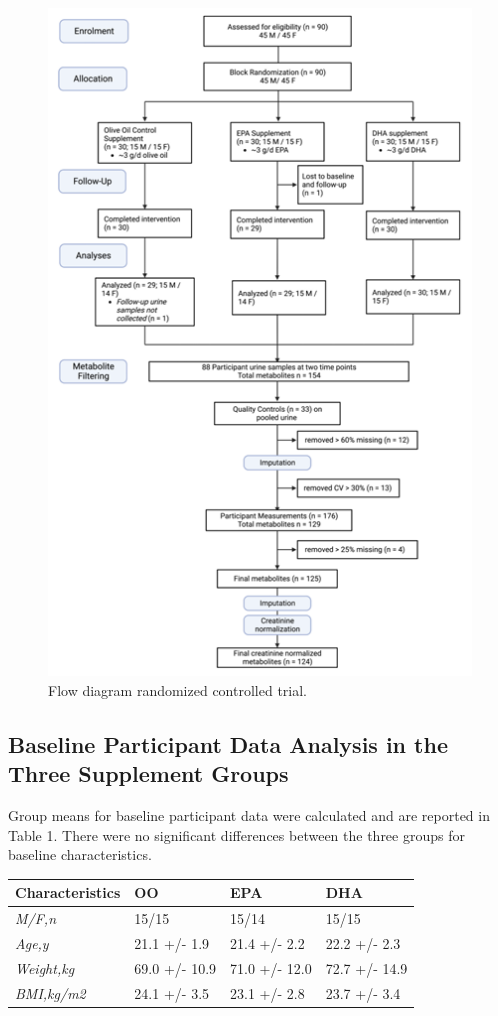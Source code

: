 \documentclass[journal=jacsat,manuscript=article]{achemso}
\begin{document}
\begin{figure}
\includegraphics[width=0.8\linewidth]{../Figures/Participants_study_design} \caption{Flow diagram randomized controlled trial.}\label{fig:unnamed-chunk-1}
\end{figure}

\subsection{Baseline Participant Data Analysis in the Three Supplement
Groups}\label{baseline-participant-data-analysis-in-the-three-supplement-groups}

Group means for baseline participant data were calculated and are
reported in Table 1. There were no significant differences between the
three groups for baseline characteristics.

\begin{longtable}[]{@{}llll@{}}
\toprule\noalign{}
\textbf{Characteristics} & \textbf{OO} & \textbf{EPA} & \textbf{DHA} \\
\midrule\noalign{}
\endhead
\bottomrule\noalign{}
\endlastfoot
\emph{M/F,n} & 15/15 & 15/14 & 15/15 \\
\emph{Age,y} & 21.1 +/- 1.9 & 21.4 +/- 2.2 & 22.2 +/- 2.3 \\
\emph{Weight,kg} & 69.0 +/- 10.9 & 71.0 +/- 12.0 & 72.7 +/- 14.9 \\
\emph{BMI,kg/m2} & 24.1 +/- 3.5 & 23.1 +/- 2.8 & 23.7 +/- 3.4 \\
\end{longtable}
\end{document}
